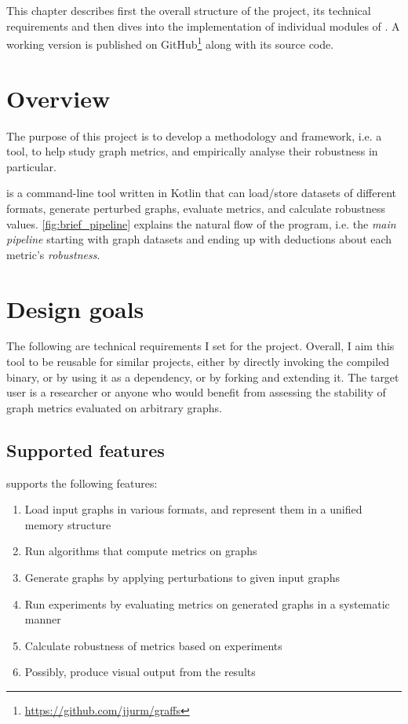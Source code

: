 This chapter describes first the overall structure of the project, its technical requirements and then dives into the implementation of individual modules of \graffs.
A working version is published on GitHub\footnote{\url{https://github.com/jjurm/graffs}} along with its source code.


\section{Overview}

The purpose of this project is to develop a methodology and framework, i.e. a tool, to help study graph metrics, and empirically analyse their robustness in particular.

\graffs is a command-line tool written in Kotlin that can load/store datasets of different formats, generate perturbed graphs, evaluate metrics, and calculate robustness values. \autoref{fig:brief_pipeline} explains the natural flow of the program, i.e. the \textsl{main pipeline} starting with graph datasets and ending up with deductions about each metric's \textsl{robustness}.




\section{Design goals}\label{sec:design-goals}

The following are technical requirements I set for the project.
Overall, I aim this tool to be reusable for similar projects, either by directly invoking the compiled binary, or by using it as a dependency, or by forking and extending it.
The target user is a researcher or anyone who would benefit from assessing the stability of graph metrics evaluated on arbitrary graphs.

\subsection{Supported features}

\graffs supports the following features:

\begin{enumerate}[itemsep=-2pt,topsep=0pt]
    \item Load input graphs in various formats, and represent them in a unified memory structure
    \item Run algorithms that compute metrics on graphs
    \item Generate graphs by applying perturbations to given input graphs
    \item Run experiments by evaluating metrics on generated graphs in a systematic manner
    \item Calculate robustness of metrics based on experiments
    \item Possibly, produce visual output from the results
\end{enumerate}

